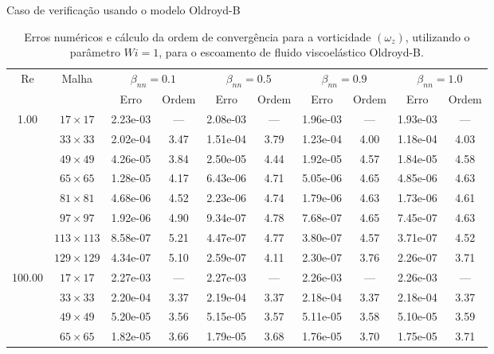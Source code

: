 \begin{frame}{Caso de verificação usando o modelo Oldroyd-B}
    \centering
    \begin{table}[H]
\caption{Erros numéricos e cálculo da ordem de convergência para a vorticidade $(\omega_{z})$, utilizando o parâmetro $Wi=1$, para o escoamento de fluido viscoelástico Oldroyd-B.\label{tab_OldroydBWzResumida}}
\scriptsize{
    \begin{tabular*}{\textwidth}{@{\extracolsep\fill}cccccccccc@{}}
    \hline
    \multirow{2}{*}{$\operatorname{Re}$} & \multirow{2}{*}{Malha} & \multicolumn{2}{c}{$\beta_{nn}=0.1$}  & \multicolumn{2}{c}{$\beta_{nn}=0.5$}  & \multicolumn{2}{c}{$\beta_{nn}=0.9$}  & \multicolumn{2}{c}{$\beta_{nn}=1.0$}\\ %
     & & Erro & Ordem & Erro & Ordem & Erro & Ordem & Erro & Ordem \\
    \hline
    \multirow{7}{*}{1.00} & $17\times 17$ & 2.23e-03 & --- & 2.08e-03 & --- & 1.96e-03 & --- & 1.93e-03 & --- \\
    & $33\times 33$ & 2.02e-04 & 3.47 & 1.51e-04 & 3.79 & 1.23e-04 & 4.00 & 1.18e-04 & 4.03 \\
    & $49\times 49$ & 4.26e-05 & 3.84 & 2.50e-05 & 4.44 & 1.92e-05 & 4.57 & 1.84e-05 & 4.58 \\
    & $65\times 65$ & 1.28e-05 & 4.17 & 6.43e-06 & 4.71 & 5.05e-06 & 4.65 & 4.85e-06 & 4.63 \\
    & $81\times 81$ & 4.68e-06 & 4.52 & 2.23e-06 & 4.74 & 1.79e-06 & 4.63 & 1.73e-06 & 4.61 \\
    & $97\times 97$ & 1.92e-06 & 4.90 & 9.34e-07 & 4.78 & 7.68e-07 & 4.65 & 7.45e-07 & 4.63 \\
    & $113\times 113$ & 8.58e-07 & 5.21 & 4.47e-07 & 4.77 & 3.80e-07 & 4.57 & 3.71e-07 & 4.52 \\
    & $129\times 129$ & 4.34e-07 & 5.10 & 2.59e-07 & 4.11 & 2.30e-07 & 3.76 & 2.26e-07 & 3.71 \\
    \hline\hline
    \multirow{7}{*}{100.00} & $17\times 17$ & 2.27e-03 & --- & 2.27e-03 & --- & 2.26e-03 & --- & 2.26e-03 & --- \\
    & $33\times 33$ & 2.20e-04 & 3.37 & 2.19e-04 & 3.37 & 2.18e-04 & 3.37 & 2.18e-04 & 3.37 \\
    & $49\times 49$ & 5.20e-05 & 3.56 & 5.15e-05 & 3.57 & 5.11e-05 & 3.58 & 5.10e-05 & 3.59 \\
    & $65\times 65$ & 1.82e-05 & 3.66 & 1.79e-05 & 3.68 & 1.76e-05 & 3.70 & 1.75e-05 & 3.71 \\

\end{tabular*}}
\end{table}
\end{frame}
